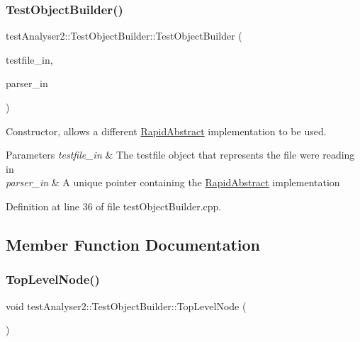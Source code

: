 \subsubsection{\texorpdfstring{TestObjectBuilder()}{TestObjectBuilder()}\hspace{0.1cm}{\footnotesize\ttfamily [2/2]}}
{\footnotesize\ttfamily test\+Analyser2\+::\+Test\+Object\+Builder\+::\+Test\+Object\+Builder (\begin{DoxyParamCaption}\item[{\mbox{\hyperlink{classtestAnalyser2_1_1TestFile}{Test\+File}} \&}]{testfile\+\_\+in,  }\item[{std\+::unique\+\_\+ptr$<$ \mbox{\hyperlink{classtestAnalyser2_1_1I__RapidAbstract}{I\+\_\+\+Rapid\+Abstract}} $>$}]{parser\+\_\+in }\end{DoxyParamCaption})}



Constructor, allows a different \mbox{\hyperlink{classtestAnalyser2_1_1RapidAbstract}{Rapid\+Abstract}} implementation to be used. 


\begin{DoxyParams}{Parameters}
{\em testfile\+\_\+in} & The testfile object that represents the file we\textquotesingle{}re reading in \\
\hline
{\em parser\+\_\+in} & A unique pointer containing the \mbox{\hyperlink{classtestAnalyser2_1_1RapidAbstract}{Rapid\+Abstract}} implementation \\
\hline
\end{DoxyParams}


Definition at line 36 of file test\+Object\+Builder.\+cpp.



\subsection{Member Function Documentation}
\mbox{\label{classtestAnalyser2_1_1TestObjectBuilder_a2186737583098c685304c215da5b3e1a}} 
\subsubsection{\texorpdfstring{TopLevelNode()}{TopLevelNode()}}
{\footnotesize\ttfamily void test\+Analyser2\+::\+Test\+Object\+Builder\+::\+Top\+Level\+Node (\begin{DoxyParamCaption}{ }\end{DoxyParamCaption})}



